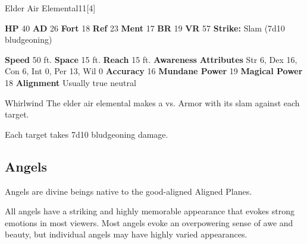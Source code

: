   \begin{monsubsection}{Elder Air Elemental}{11}[4]
    \vspace{-1em}\vspace{-1em}
    \vspace{0em}

    
    

    \begin{spellcontent}
      \begin{spelltargetinginfo}
        \pari \textbf{HP} 40 \monsep
          \textbf{AD} 26 \monsep
          \textbf{Fort} 18 \monsep
          \textbf{Ref} 23 \monsep
          \textbf{Ment} 17
        \pari \textbf{BR} 19 \monsep
        \textbf{VR} 57
        \pari \textbf{Strike:}
            Slam  (7d10 bludgeoning)
      \end{spelltargetinginfo}
    \end{spellcontent}
    \begin{monsterfooter}
      \pari \textbf{Speed} 50 ft. \monsep
        \textbf{Space} 15 ft. \monsep
        \textbf{Reach} 15 ft.
      \pari \textbf{Awareness} 
      \pari \textbf{Attributes}
        Str 6, Dex 16,
        Con 6, Int 0,
        Per 13, Wil 0
      \pari \textbf{Accuracy} 16 \monsep
        \textbf{Mundane Power} 19 \monsep
      \textbf{Magical Power} 18
      \pari \textbf{Alignment} Usually true neutral
    \end{monsterfooter}
  \end{monsubsection}
  \begin{freeability}{Whirlwind}
       The elder air elemental makes a 
         vs. Armor
        with its slam against each target.
    
    \hit Each target takes 7d10 bludgeoning damage.
    \end{freeability}
  
  
    \subsection{Angels}
      
      Angels are divine beings native to the good-aligned Aligned Planes.
    
      All angels have a striking and highly memorable appearance that evokes strong emotions in most viewers.
      Most angels evoke an overpowering sense of awe and beauty, but individual angels may have highly varied appearances.
    

